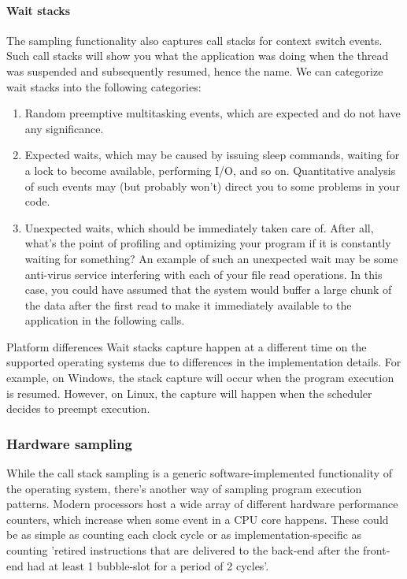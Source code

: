 \documentclass[hidelinks,titlepage,a4paper]{article}
\begin{document}
\paragraph{Wait stacks}
\label{waitstacks}

The sampling functionality also captures call stacks for context switch events. Such call stacks will show you what the application was doing when the thread was suspended and subsequently resumed, hence the name. We can categorize wait stacks into the following categories:

\begin{enumerate}
\item Random preemptive multitasking events, which are expected and do not have any significance.
\item Expected waits, which may be caused by issuing sleep commands, waiting for a lock to become available, performing I/O, and so on. Quantitative analysis of such events may (but probably won't) direct you to some problems in your code.
\item Unexpected waits, which should be immediately taken care of. After all, what's the point of profiling and optimizing your program if it is constantly waiting for something? An example of such an unexpected wait may be some anti-virus service interfering with each of your file read operations. In this case, you could have assumed that the system would buffer a large chunk of the data after the first read to make it immediately available to the application in the following calls.
\end{enumerate}

\begin{bclogo}[
noborder=true,
couleur=black!5,
logo=\bcattention
]{Platform differences}
Wait stacks capture happen at a different time on the supported operating systems due to differences in the implementation details. For example, on Windows, the stack capture will occur when the program execution is resumed. However, on Linux, the capture will happen when the scheduler decides to preempt execution.
\end{bclogo}

\subsubsection{Hardware sampling}
\label{hardwaresampling}

While the call stack sampling is a generic software-implemented functionality of the operating system, there's another way of sampling program execution patterns. Modern processors host a wide array of different hardware performance counters, which increase when some event in a CPU core happens. These could be as simple as counting each clock cycle or as implementation-specific as counting 'retired instructions that are delivered to the back-end after the front-end had at least 1 bubble-slot for a period of 2 cycles'.
\end{document}
